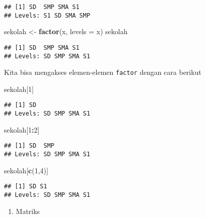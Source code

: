 \documentclass[
]{book}
\newenvironment{Shaded}{\begin{snugshade}}{\end{snugshade}}
\newcommand{\DataTypeTok}[1]{\textcolor[rgb]{0.13,0.29,0.53}{#1}}
\newcommand{\DecValTok}[1]{\textcolor[rgb]{0.00,0.00,0.81}{#1}}
\newcommand{\KeywordTok}[1]{\textcolor[rgb]{0.13,0.29,0.53}{\textbf{#1}}}
\newcommand{\NormalTok}[1]{#1}
\newcommand{\OperatorTok}[1]{\textcolor[rgb]{0.81,0.36,0.00}{\textbf{#1}}}
\newcommand{\StringTok}[1]{\textcolor[rgb]{0.31,0.60,0.02}{#1}}
\providecommand{\tightlist}{%
  \setlength{\itemsep}{0pt}\setlength{\parskip}{0pt}}
\begin{document}
\begin{verbatim}
## [1] SD  SMP SMA S1 
## Levels: S1 SD SMA SMP
\end{verbatim}

\begin{Shaded}
\begin{Highlighting}[]
\NormalTok{sekolah \textless{}{-}}\StringTok{ }\KeywordTok{factor}\NormalTok{(x, }\DataTypeTok{levels =}\NormalTok{ x)}
\NormalTok{sekolah}
\end{Highlighting}
\end{Shaded}

\begin{verbatim}
## [1] SD  SMP SMA S1 
## Levels: SD SMP SMA S1
\end{verbatim}

Kita bisa mengakses elemen-elemen \texttt{factor} dengan cara berikut

\begin{Shaded}
\begin{Highlighting}[]
\NormalTok{sekolah[}\DecValTok{1}\NormalTok{] }
\end{Highlighting}
\end{Shaded}

\begin{verbatim}
## [1] SD
## Levels: SD SMP SMA S1
\end{verbatim}

\begin{Shaded}
\begin{Highlighting}[]
\NormalTok{sekolah[}\DecValTok{1}\OperatorTok{:}\DecValTok{2}\NormalTok{]}
\end{Highlighting}
\end{Shaded}

\begin{verbatim}
## [1] SD  SMP
## Levels: SD SMP SMA S1
\end{verbatim}

\begin{Shaded}
\begin{Highlighting}[]
\NormalTok{sekolah[}\KeywordTok{c}\NormalTok{(}\DecValTok{1}\NormalTok{,}\DecValTok{4}\NormalTok{)]}
\end{Highlighting}
\end{Shaded}

\begin{verbatim}
## [1] SD S1
## Levels: SD SMP SMA S1
\end{verbatim}

\begin{enumerate}
\def\labelenumi{\arabic{enumi}.}
\setcounter{enumi}{2}
\tightlist
\item
  Matriks
\end{enumerate}
\end{document}
